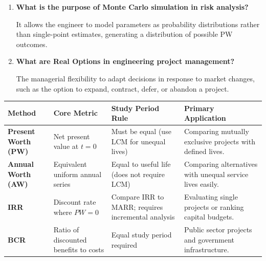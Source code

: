 \documentclass[12pt,a4paper]{article}
\newcommand{\Q}[1]{\textbf{#1}\par\noindent\ignorespaces}
\renewcommand{\arraystretch}{1.45}
\begin{document}
\begin{tcolorbox}[exambox, title={\textbf{Frequently Asked / Viva Questions}}]
\begin{enumerate}[topsep=0pt, label=\textbf{Q\arabic*.}, itemsep=5pt]
  \item \Q{What is the purpose of Monte Carlo simulation in risk analysis?}
    It allows the engineer to model parameters as probability distributions rather than single-point estimates, generating a distribution of possible PW outcomes.
  \item \Q{What are Real Options in engineering project management?}
    The managerial flexibility to adapt decisions in response to market changes, such as the option to expand, contract, defer, or abandon a project.
\end{enumerate}
\end{tcolorbox}

\begin{tcolorbox}[tikzbox, title={Comparison of Project Selection Methods under Equivalence}]
\renewcommand{\arraystretch}{1.45}
\par\noindent
\begin{tabularx}{\linewidth}{|B{2.3cm}|Y|Y|Y|}
\hline
\textbf{Method} & \textbf{Core Metric} & \textbf{Study Period Rule} & \textbf{Primary Application} \\
\hline
\textbf{Present Worth (PW)} & Net present value at $t=0$ & Must be equal (use LCM for unequal lives) & Comparing mutually exclusive projects with defined lives. \\
\hline
\textbf{Annual Worth (AW)} & Equivalent uniform annual series & Equal to useful life (does not require LCM) & Comparing alternatives with unequal service lives easily. \\
\hline
\textbf{IRR} & Discount rate where $PW = 0$ & Compare IRR to MARR; requires incremental analysis & Evaluating single projects or ranking capital budgets. \\
\hline
\textbf{BCR} & Ratio of discounted benefits to costs & Equal study period required & Public sector projects and government infrastructure. \\
\hline
\end{tabularx}
\end{tcolorbox}
\end{document}
